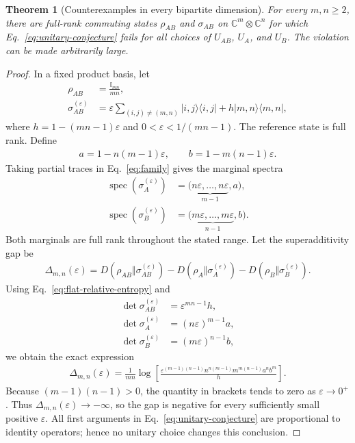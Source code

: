 \documentclass[
  aps,
  pra,
  reprint,
  superscriptaddress,
  nofootinbib,
  longbibliography
]{revtex4-2}
\newtheorem{theorem}{Theorem}
\theoremstyle{remark}
\newcommand{\identity}{\mathbb{I}}
\newcommand{\ketbra}[1]{\lvert #1\rangle\!\langle #1\rvert}
\begin{document}
\begin{theorem}[Counterexamples in every bipartite dimension]
\label{thm:all-dimensions}
For every $m,n\geq2$, there are full-rank commuting states
$\rho_{AB}$ and $\sigma_{AB}$ on
$\mathbb{C}^m\otimes\mathbb{C}^n$ for which
Eq.~\eqref{eq:unitary-conjecture} fails for all choices of
$U_{AB}$, $U_A$, and $U_B$.  The violation can be made arbitrarily large.
\end{theorem}

\begin{proof}
In a fixed product basis, let
\begin{align}
 \rho_{AB}&=\frac{\identity_{mn}}{mn},
 \nonumber\\
 \sigma_{AB}^{(\varepsilon)}
 &=\varepsilon\!\sum_{(i,j)\neq(m,n)}\ketbra{i,j}
 +h\ketbra{m,n},
 \label{eq:family}
\end{align}
where $h=1-(mn-1)\varepsilon$ and
$0<\varepsilon<1/(mn-1)$.  The reference state is full rank.  Define
\begin{align}
 a=1-n(m-1)\varepsilon,
 \qquad b=1-m(n-1)\varepsilon.
 \label{eq:ab}
\end{align}
Taking partial traces in Eq.~\eqref{eq:family} gives the marginal spectra
\begin{align}
 \operatorname{spec}(\sigma_A^{(\varepsilon)})
 &=\bigl(\underbrace{n\varepsilon,\ldots,n\varepsilon}_{m-1},a\bigr),
 \nonumber\\
 \operatorname{spec}(\sigma_B^{(\varepsilon)})
 &=\bigl(\underbrace{m\varepsilon,\ldots,m\varepsilon}_{n-1},b\bigr).
 \label{eq:marginal-spectra}
\end{align}
Both marginals are full rank throughout the stated range.  Let the
superadditivity gap be
\begin{align}
 \Delta_{m,n}(\varepsilon)
 =D(\rho_{AB}\Vert\sigma_{AB}^{(\varepsilon)})
 -D(\rho_A\Vert\sigma_A^{(\varepsilon)})
 -D(\rho_B\Vert\sigma_B^{(\varepsilon)}).
 \label{eq:gap-definition}
\end{align}
Using Eq.~\eqref{eq:flat-relative-entropy} and
\begin{align}
 \det\sigma_{AB}^{(\varepsilon)}&=\varepsilon^{mn-1}h,
 \nonumber\\
 \det\sigma_A^{(\varepsilon)}&=(n\varepsilon)^{m-1}a,
 \nonumber\\
 \det\sigma_B^{(\varepsilon)}&=(m\varepsilon)^{n-1}b,
\end{align}
we obtain the exact expression
\begin{align}
 \Delta_{m,n}(\varepsilon)
 =\frac{1}{mn}\log\!\left[
 \frac{
 \varepsilon^{(m-1)(n-1)}
 n^{n(m-1)}m^{m(n-1)}a^n b^m}{h}
 \right].
 \label{eq:all-dimensional-gap}
\end{align}
Because $(m-1)(n-1)>0$, the quantity in brackets tends to zero as
$\varepsilon\to0^+$.  Thus
$\Delta_{m,n}(\varepsilon)\to-\infty$, so the gap is negative for every
sufficiently small positive $\varepsilon$.  All first arguments in
Eq.~\eqref{eq:unitary-conjecture} are proportional to identity operators;
hence no unitary choice changes this conclusion.
\end{proof}
\end{document}
